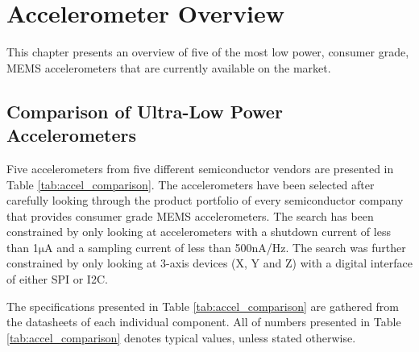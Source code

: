 \chapter{Accelerometer Overview}
\label{chap:overview}

This chapter presents an overview of five of the most low power, consumer grade, MEMS accelerometers that are currently available on the market.

\section{Comparison of Ultra-Low Power Accelerometers}

Five accelerometers from five different semiconductor vendors are presented in Table \ref{tab:accel_comparison}. The accelerometers have been selected after carefully looking through the product portfolio of every semiconductor company that provides consumer grade MEMS accelerometers. The search has been constrained by only looking at accelerometers with a shutdown current of less than 1$\si{\micro\ampere}$ and a sampling current of less than 500$\si{\nano\ampere}$/Hz. The search was further constrained by only looking at 3-axis devices (X, Y and Z) with a digital interface of either SPI or I2C.

The specifications presented in Table \ref{tab:accel_comparison} are gathered from the datasheets of each individual component. All of numbers presented in Table \ref{tab:accel_comparison} denotes typical values, unless stated otherwise. 

